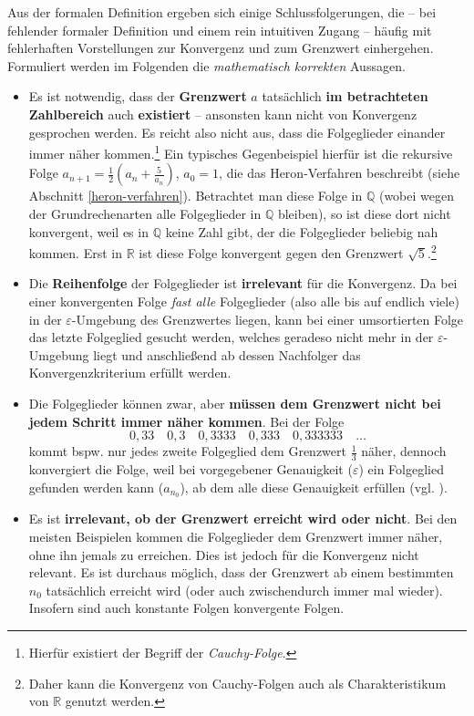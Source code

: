 \documentclass[
]{scrbook}
\theoremstyle{definition}
\theoremstyle{definition}
\theoremstyle{definition}
\theoremstyle{definition}
\theoremstyle{remark}
\begin{document}
Aus der formalen Definition ergeben sich einige Schlussfolgerungen, die -- bei fehlender formaler Definition und einem rein intuitiven Zugang -- häufig mit fehlerhaften Vorstellungen zur Konvergenz und zum Grenzwert einhergehen. Formuliert werden im Folgenden die \emph{mathematisch korrekten} Aussagen.

\begin{itemize}
\item
  Es ist notwendig, dass der \textbf{Grenzwert} \(a\) tatsächlich \textbf{im betrachteten Zahlbereich} auch \textbf{existiert} -- ansonsten kann nicht von Konvergenz gesprochen werden. Es reicht also nicht aus, dass die Folgeglieder einander immer näher kommen.\footnote{Hierfür existiert der Begriff der \emph{Cauchy-Folge}.} Ein typisches Gegenbeispiel hierfür ist die rekursive Folge \(a_{n+1} = \frac{1}{2}\left(a_n+\frac{5}{a_n}\right)\), \(a_0 = 1\), die das Heron-Verfahren beschreibt (siehe Abschnitt \ref{heron-verfahren}). Betrachtet man diese Folge in \(\mathbb{Q}\) (wobei wegen der Grundrechenarten alle Folgeglieder in \(\mathbb{Q}\) bleiben), so ist diese dort nicht konvergent, weil es in \(\mathbb{Q}\) keine Zahl gibt, der die Folgeglieder beliebig nah kommen. Erst in \(\mathbb{R}\) ist diese Folge konvergent gegen den Grenzwert \(\sqrt{5}\).\footnote{Daher kann die Konvergenz von Cauchy-Folgen auch als Charakteristikum von \(\mathbb{R}\) genutzt werden.}
\item
  Die \textbf{Reihenfolge} der Folgeglieder ist \textbf{irrelevant} für die Konvergenz. Da bei einer konvergenten Folge \emph{fast alle} Folgeglieder (also alle bis auf endlich viele) in der \(\varepsilon\)-Umgebung des Grenzwertes liegen, kann bei einer umsortierten Folge das letzte Folgeglied gesucht werden, welches geradeso nicht mehr in der \(\varepsilon\)-Umgebung liegt und anschließend ab dessen Nachfolger das Konvergenzkriterium erfüllt werden.
\item
  Die Folgeglieder können zwar, aber \textbf{müssen dem Grenzwert nicht bei jedem Schritt immer näher kommen}. Bei der Folge \[0,33\quad 0,3\quad 0,3333 \quad 0,333 \quad0,333333 \quad  \ldots\]
  kommt bspw. nur jedes zweite Folgeglied dem Grenzwert \(\frac{1}{3}\) näher, dennoch konvergiert die Folge, weil bei vorgegebener Genauigkeit (\(\varepsilon\)) ein Folgeglied gefunden werden kann (\(a_{n_0}\)), ab dem alle diese Genauigkeit erfüllen (vgl. ).
\item
  Es ist \textbf{irrelevant, ob der Grenzwert erreicht wird oder nicht}. Bei den meisten Beispielen kommen die Folgeglieder dem Grenzwert immer näher, ohne ihn jemals zu erreichen. Dies ist jedoch für die Konvergenz nicht relevant. Es ist durchaus möglich, dass der Grenzwert ab einem bestimmten \(n_0\) tatsächlich erreicht wird (oder auch zwischendurch immer mal wieder). Insofern sind auch konstante Folgen konvergente Folgen.
\end{itemize}
\end{document}
